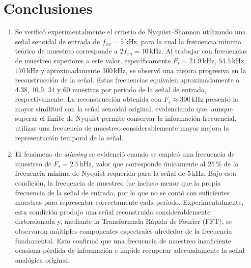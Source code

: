 \documentclass[conference]{IEEEtran}
\begin{document}

\section{Conclusiones}

\begin{enumerate}

    \item Se verificó experimentalmente el criterio de Nyquist--Shannon utilizando una señal senoidal de entrada de $f_{xa}=5\,\text{kHz}$, para la cual la frecuencia mínima teórica de muestreo corresponde a $2f_{xa}=10\,\text{kHz}$. Al trabajar con frecuencias de muestreo superiores a este valor, específicamente $F_s=21.9\,\text{kHz}$, $54.5\,\text{kHz}$, $170\,\text{kHz}$ y aproximadamente $300\,\text{kHz}$, se observó una mejora progresiva en la reconstrucción de la señal. Estas frecuencias equivalen aproximadamente a 4.38, 10.9, 34 y 60 muestras por período de la señal de entrada, respectivamente. La reconstrucción obtenida con $F_s \approx 300\,\text{kHz}$ presentó la mayor similitud con la señal senoidal original, evidenciando que, aunque superar el límite de Nyquist permite conservar la información frecuencial, utilizar una frecuencia de muestreo considerablemente mayor mejora la representación temporal de la señal.

    \item El fenómeno de \textit{aliasing} se evidenció cuando se empleó una frecuencia de muestreo de $F_s=2.5\,\text{kHz}$, valor que corresponde únicamente al $25\,\%$ de la frecuencia mínima de Nyquist requerida para la señal de $5\,\text{kHz}$. Bajo esta condición, la frecuencia de muestreo fue incluso menor que la propia frecuencia de la señal de entrada, por lo que no se contó con suficientes muestras para representar correctamente cada período. Experimentalmente, esta condición produjo una señal reconstruida considerablemente distorsionada y, mediante la Transformada Rápida de Fourier (FFT), se observaron múltiples componentes espectrales alrededor de la frecuencia fundamental. Esto confirmó que una frecuencia de muestreo insuficiente ocasiona pérdida de información e impide recuperar adecuadamente la señal analógica original.


\end{enumerate}
\end{document}
